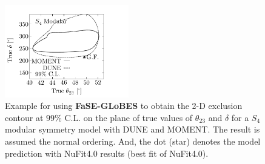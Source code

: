 \documentclass[aps,prd,nofootinbib,preprint]{revtex4}
\begin{document}

\begin{figure}[!h]
 \centering
\includegraphics[width=0.48\textwidth]{Figs/MM_th23_dCP.pdf}
\caption{\label{fig:th23_delta}Example for using \textbf{FaSE-GLoBES} to obtain the 2-D exclusion contour at $99\%$ C.L. on the plane of true values of $\theta_{23}$ and $\delta$ for a $S_4$ modular symmetry model with DUNE and MOMENT. The result is assumed the normal ordering. And, the dot (star) denotes the model prediction with NuFit4.0 results (best fit of NuFit4.0).}
\end{figure}
\end{document}
